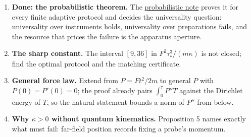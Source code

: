 \documentclass[11pt,a4paper]{article}
\newcommand{\tightlist}{\setlength{\itemsep}{0pt}\setlength{\parskip}{0pt}}
\begin{document}
\begin{enumerate}
\def\labelenumi{\arabic{enumi}.}
\tightlist
\item
  \textbf{Done: the probabilistic theorem.} The
  \href{planck-gap-probabilistic.md}{probabilistic note} proves it for
  every finite adaptive protocol and decides the universality question:
  universality over instruments holds, universality over preparations
  fails, and the resource that prices the failure is the apparatus
  aperture.
\item
  \textbf{The sharp constant.} The interval \([9,36]\) in
  \(F^2\tau_*^3/(m\kappa)\) is not closed; find the optimal protocol and
  the matching certificate.
\item
  \textbf{General force law.} Extend from \(P=Ft^2/2m\) to general \(P\)
  with \(P(0)=P'(0)=0\); the proof already pairs \(\int_0^\tau P''T\)
  against the Dirichlet energy of \(T\), so the natural statement bounds
  a norm of \(P''\) from below.
\item
  \textbf{Why \(\kappa>0\) without quantum kinematics.} Proposition 5
  names exactly what must fail: far-field position records fixing a
  probe's momentum.
\end{enumerate}
\end{document}
